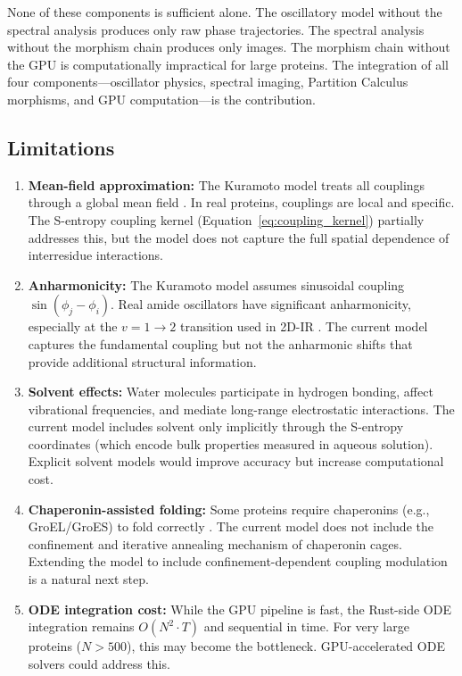 \documentclass[11pt,twocolumn,a4paper]{article}
\theoremstyle{definition}
\theoremstyle{remark}
\begin{document}
None of these components is sufficient alone. The oscillatory model without the spectral analysis produces only raw phase trajectories. The spectral analysis without the morphism chain produces only images. The morphism chain without the GPU is computationally impractical for large proteins. The integration of all four components---oscillator physics, spectral imaging, Partition Calculus morphisms, and GPU computation---is the contribution.

\subsection{Limitations}

\begin{enumerate}
    \item \textbf{Mean-field approximation:} The Kuramoto model treats all couplings through a global mean field \citep{acebron2005}. In real proteins, couplings are local and specific. The S-entropy coupling kernel (Equation~\ref{eq:coupling_kernel}) partially addresses this, but the model does not capture the full spatial dependence of interresidue interactions.

    \item \textbf{Anharmonicity:} The Kuramoto model assumes sinusoidal coupling $\sin(\phi_j - \phi_i)$. Real amide oscillators have significant anharmonicity, especially at the $v=1 \to 2$ transition used in 2D-IR \citep{hamm2011}. The current model captures the fundamental coupling but not the anharmonic shifts that provide additional structural information.

    \item \textbf{Solvent effects:} Water molecules participate in hydrogen bonding, affect vibrational frequencies, and mediate long-range electrostatic interactions. The current model includes solvent only implicitly through the S-entropy coordinates (which encode bulk properties measured in aqueous solution). Explicit solvent models would improve accuracy but increase computational cost.

    \item \textbf{Chaperonin-assisted folding:} Some proteins require chaperonins (e.g., GroEL/GroES) to fold correctly \citep{hartl2002}. The current model does not include the confinement and iterative annealing mechanism of chaperonin cages. Extending the model to include confinement-dependent coupling modulation is a natural next step.

    \item \textbf{ODE integration cost:} While the GPU pipeline is fast, the Rust-side ODE integration remains $O(N^2 \cdot T)$ and sequential in time. For very large proteins ($N > 500$), this may become the bottleneck. GPU-accelerated ODE solvers could address this.
\end{enumerate}
\end{document}
